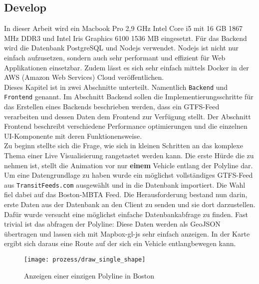 \begin{newpage}
  \section{Develop}
  \label{sec:develop}

    In dieser Arbeit wird ein Macbook Pro 2,9 GHz Intel Core i5 mit 16 GB 1867 MHz DDR3 und Intel Iris Graphics 6100 1536 MB eingesetzt.
    Für das Backend wird die Datenbank PostgreSQL und Nodejs verwendet. Nodejs ist nicht nur einfach aufzusetzen, sondern auch sehr performant und effizient für Web Applikationen einsetzbar. Zudem lässt es sich sehr einfach mittels Docker in der AWS (Amazon Web Services) Cloud veröffentlichen.\\

    Dieses Kapitel ist in zwei Abschnitte unterteilt. Namentlich \texttt{Backend} und \texttt{Frontend} genannt. Im Abschnitt Backend sollen die Implementierungsschritte für das Erstellen eines Backends beschrieben werden, dass ein GTFS-Feed verarbeiten und dessen Daten dem Frontend zur Verfügung stellt. Der Abschnitt Frontend beschreibt verschiedene Performance optimierungen und die einzelnen UI-Komponente mit deren Funktionensweise.\\

    Zu beginn stellte sich die Frage, wie sich in kleinen Schritten an das komplexe Thema einer Live Visualisierung rangetastet werden kann. Die erste Hürde die zu nehmen ist, stellt die Animation vor nur \textbf{einem} Vehicle entlang der Polyline dar.
    Um eine Datengrundlage zu haben wurde ein möglichst vollständiges GTFS-Feed aus \texttt{TransitFeeds.com} ausgewählt und in die Datenbank importiert. Die Wahl fiel dabei auf das Boston-MBTA Feed. Die Herausforderung bestand nun darin, erste Daten aus der Datenbank an den Client zu senden und sie dort darzustellen. Dafür wurde versucht eine möglichst einfache Datenbankabfrage zu finden. Fast trivial ist das abfragen der Polyline: \colorbox{lightGrey}{\texttt{}}
    Diese Daten werden als GeoJSON übertragen und lassen sich mit Mapbox-gl-js sehr einfach anzeigen. In der Karte ergibt sich daraus eine Route auf der sich ein Vehicle entlangbewegen kann.

    \begin{figure}[htbp]
      \begin{center}
        \texttt{[image: prozess/draw\_single\_shape]}
        \caption{Anzeigen einer einzigen Polyline in Boston}
        \label{fig:prozess/draw_single_shape}
      \end{center}
    \end{figure}
    

\end{newpage}
